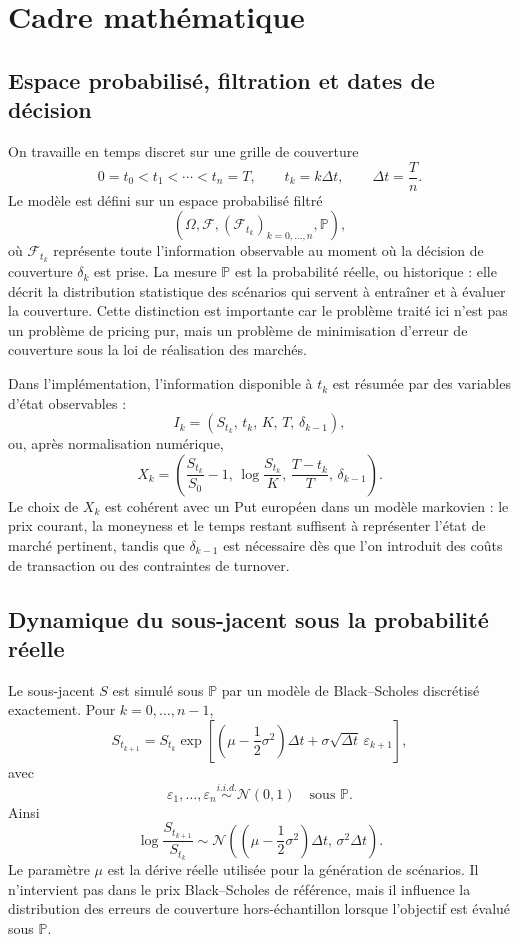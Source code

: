 \documentclass[11pt,a4paper]{article}
\begin{document}
\section{Cadre mathématique}

\subsection{Espace probabilisé, filtration et dates de décision}

On travaille en temps discret sur une grille de couverture
\[
0=t_0<t_1<\cdots<t_n=T,\qquad t_k=k\Delta t,\qquad \Delta t=\frac{T}{n}.
\]
Le modèle est défini sur un espace probabilisé filtré
\[
(\Omega,\mathcal{F},(\mathcal{F}_{t_k})_{k=0,\ldots,n},\mathbb{P}),
\]
où $\mathcal{F}_{t_k}$ représente toute l'information observable au moment où
la décision de couverture $\delta_k$ est prise. La mesure $\mathbb{P}$ est la
probabilité réelle, ou historique : elle décrit la distribution statistique des
scénarios qui servent à entraîner et à évaluer la couverture. Cette distinction
est importante car le problème traité ici n'est pas un problème de pricing pur,
mais un problème de minimisation d'erreur de couverture sous la loi de
réalisation des marchés.

Dans l'implémentation, l'information disponible à $t_k$ est résumée par des
variables d'état observables :
\[
I_k=\left(S_{t_k},\, t_k,\, K,\, T,\, \delta_{k-1}\right),
\]
ou, après normalisation numérique,
\[
X_k=\left(\frac{S_{t_k}}{S_0}-1,\,
\log\frac{S_{t_k}}{K},\,
\frac{T-t_k}{T},\,
\delta_{k-1}\right).
\]
Le choix de $X_k$ est cohérent avec un Put européen dans un modèle markovien :
le prix courant, la moneyness et le temps restant suffisent à représenter l'état
de marché pertinent, tandis que $\delta_{k-1}$ est nécessaire dès que l'on
introduit des coûts de transaction ou des contraintes de turnover.

\subsection{Dynamique du sous-jacent sous la probabilité réelle}

Le sous-jacent $S$ est simulé sous $\mathbb{P}$ par un modèle de Black--Scholes
discrétisé exactement. Pour $k=0,\ldots,n-1$,
\[
S_{t_{k+1}}
=S_{t_k}\exp\left[
\left(\mu-\frac12\sigma^2\right)\Delta t
+\sigma\sqrt{\Delta t}\,\varepsilon_{k+1}
\right],
\]
avec
\[
\varepsilon_{1},\ldots,\varepsilon_n
\stackrel{i.i.d.}{\sim}\mathcal{N}(0,1)
\quad\text{sous }\mathbb{P}.
\]
Ainsi
\[
\log\frac{S_{t_{k+1}}}{S_{t_k}}
\sim
\mathcal{N}\left(
\left(\mu-\frac12\sigma^2\right)\Delta t,\,
\sigma^2\Delta t
\right).
\]
Le paramètre $\mu$ est la dérive réelle utilisée pour la génération de scénarios.
Il n'intervient pas dans le prix Black--Scholes de référence, mais il influence
la distribution des erreurs de couverture hors-échantillon lorsque l'objectif
est évalué sous $\mathbb{P}$.
\end{document}
